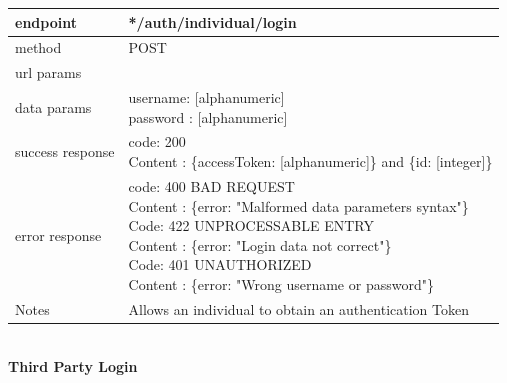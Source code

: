 \begin{legal}
\begin{legal}
\begin{itemize}
								\begin{tabularx}{\linewidth}{| l| l }
									\hline
									endpoint & */auth/individual/login \\
									\hline
									method & POST \\
									\hline
									url params & \\
									\hline
									data params &
									\parbox{0.7\textwidth}{
										\bigskip
										username: [alphanumeric]\\
										password : [alphanumeric]
										\bigskip
									} \\
									\hline
									success response &
									\parbox{0.7\textwidth}{
										\bigskip
										code: 200\\
										Content : \{accessToken: [alphanumeric]\} and \{id: [integer]\}
										\bigskip
									} \\
									\hline
									error response &
									\parbox{0.7\textwidth}{
										\bigskip
										code: 400 BAD REQUEST \\
										Content : \{error: "Malformed data parameters syntax"\}\\
										Code: 422 UNPROCESSABLE ENTRY \\
										Content : \{error: "Login data not correct"\}\\
										Code: 401 UNAUTHORIZED \\
										Content : \{error: "Wrong username or password"\}
										\bigskip
									} \\
									\hline
									Notes & 
									\parbox{0.7\textwidth}{
										\bigskip Allows an individual to obtain an authentication Token
									\bigskip }\\
									\hline
								\end{tabularx}\\
							\newpage
							\textbf{Third Party Login}\\


\end{itemize}
\end{legal}
\end{legal}
